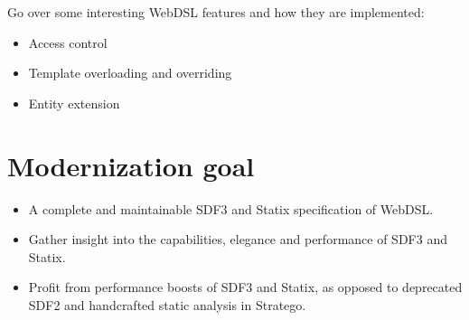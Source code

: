       Go over some interesting WebDSL features and how they are implemented:
      \begin{itemize}
        \item Access control
        \item Template overloading and overriding
        \item Entity extension
      \end{itemize}

  \section{\label{sec:modernization}Modernization goal}

    \begin{itemize}
      \item A complete and maintainable SDF3 and Statix specification of WebDSL.
      \item Gather insight into the capabilities, elegance and performance of SDF3 and Statix.
      \item Profit from performance boosts of SDF3 and Statix, as opposed to deprecated SDF2 and handcrafted static analysis in Stratego.
    \end{itemize}
